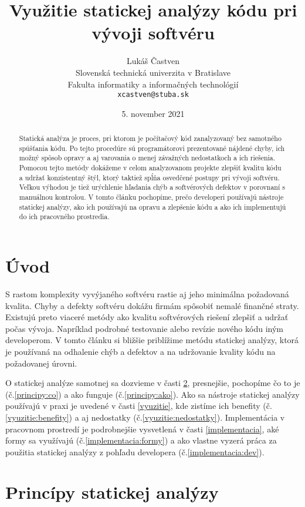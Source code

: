 \documentclass[11pt,twoside,slovak,a4paper]{article}
\title{Využitie statickej analýzy kódu pri vývoji softvéru}
\author{Lukáš Častven\\[2pt]
	{\small Slovenská technická univerzita v Bratislave}\\
	{\small Fakulta informatiky a informačných technológií}\\
	{\small \texttt{xcastven@stuba.sk}}
	}
\date{\small  5. november 2021}
\begin{document}
\maketitle

\begin{abstract}
	Statická analýza je proces, pri ktorom je počítačový kód zanalyzovaný bez samotného spúšťania kódu.
	Po tejto procedúre sú programátorovi prezentované nájdené chyby, ich možný spôsob opravy a aj varovania
	o menej závažných nedostatkoch a ich riešenia. Pomocou tejto metódy dokážeme v celom analyzovanom projekte
	zlepšiť kvalitu kódu a udržať konzistentný štýl, ktorý taktiež spĺňa osvedčené postupy pri vývoji softvéru.
	Veľkou výhodou je tiež urýchlenie hľadania chýb a softvérových defektov v porovnaní s manuálnou kontrolou.
	V tomto článku pochopíme, prečo developeri používajú nástroje statickej analýzy, ako ich používajú
	na opravu a zlepšenie kódu a ako ich implementujú do ich pracovného prostredia.
\end{abstract}

\pagestyle{plain}

\section{Úvod}
S rastom komplexity vyvýjaného softvéru rastie aj jeho minimálna požadovaná kvalita. Chyby a defekty softvéru
dokážu firmám spôsobiť nemalé finančné straty. Existujú preto viaceré metódy ako kvalitu softvérových riešení zlepšiť
a udržať počas vývoja. Napríklad podrobné testovanie alebo revízie nového kódu iným developerom. V tomto článku si
bližšie priblížime metódu statickej analýzy, ktorá je používaná na odhalenie chýb a defektov a na udržovanie kvality
kódu na požadovanej úrovni.\cite{BrittanyJohnson,LisaNguyen}

O statickej analýze samotnej sa dozvieme v časti \ref{principy}, presnejšie, pochopíme čo to je (č.\ref{principy:co}) a
ako funguje (č.\ref{principy:ako}). Ako sa nástroje statickej analýzy používajú v praxi je uvedené v časti
\ref{vyuzitie}, kde zistíme ich benefity (č.\ref{vyuzitie:benefity}) a aj nedostatky (č.\ref{vyuzitie:nedostatky}).
Implementácia v pracovnom prostredí je podrobnejšie vysvetlená v časti \ref{implementacia}, aké formy sa využívajú
(č.\ref{implementacia:formy}) a ako vlastne vyzerá práca za použitia statickej analýzy z pohľadu developera
(č.\ref{implementacia:dev}).

\pagebreak

\section{Princípy statickej analýzy} \label{principy}
\end{document}
